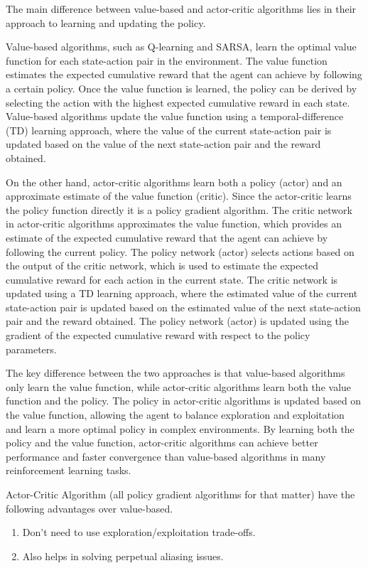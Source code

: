 \documentclass{article} %
\begin{document}
The main difference between value-based and actor-critic algorithms lies in their approach to learning and updating the policy.

Value-based algorithms, such as Q-learning and SARSA, learn the optimal value function for each state-action pair in the environment. The value function estimates the expected cumulative reward that the agent can achieve by following a certain policy. Once the value function is learned, the policy can be derived by selecting the action with the highest expected cumulative reward in each state. Value-based algorithms update the value function using a temporal-difference (TD) learning approach, where the value of the current state-action pair is updated based on the value of the next state-action pair and the reward obtained.

On the other hand, actor-critic algorithms learn both a policy (actor) and an approximate estimate of the value function (critic). Since the actor-critic learns the policy function directly it is a policy gradient algorithm. The critic network in actor-critic algorithms approximates the value function, which provides an estimate of the expected cumulative reward that the agent can achieve by following the current policy. The policy network (actor) selects actions based on the output of the critic network, which is used to estimate the expected cumulative reward for each action in the current state. The critic network is updated using a TD learning approach, where the estimated value of the current state-action pair is updated based on the estimated value of the next state-action pair and the reward obtained. The policy network (actor) is updated using the gradient of the expected cumulative reward with respect to the policy parameters.

The key difference between the two approaches is that value-based algorithms only learn the value function, while actor-critic algorithms learn both the value function and the policy. The policy in actor-critic algorithms is updated based on the value function, allowing the agent to balance exploration and exploitation and learn a more optimal policy in complex environments. By learning both the policy and the value function, actor-critic algorithms can achieve better performance and faster convergence than value-based algorithms in many reinforcement learning tasks.

Actor-Critic Algorithm (all policy gradient algorithms for that matter) have the following advantages over value-based.
\begin{enumerate}
\item Don't need to use exploration/exploitation trade-offs.
\item Also helps in solving perpetual aliasing issues.
\end{enumerate}
\end{document}
